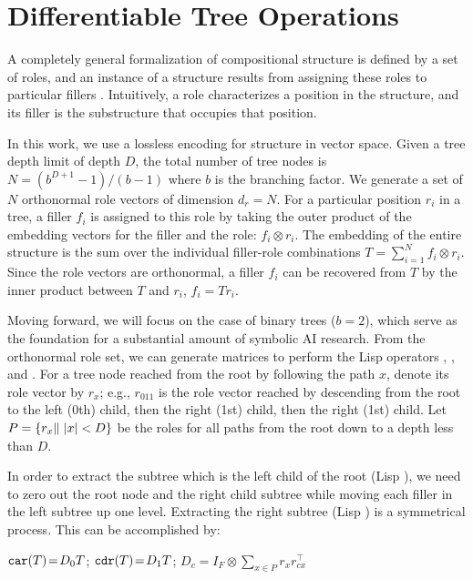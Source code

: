 \section{Differentiable Tree Operations} \label{sec:dtm-tpr}

A completely general formalization of compositional structure is defined by a set of roles, and an instance of a structure results from assigning these roles to particular fillers \citep{Newell1980PhysicalSS}. Intuitively, a role characterizes a position in the structure, and its filler is the substructure that occupies that position. 

In this work, we use a lossless encoding for structure in vector space. Given a tree depth limit of depth $D$, the total number of  tree nodes is $N=(b^{D+1}-1)/(b-1)$ where $b$ is the branching factor. We generate a set of $N$ orthonormal role vectors of dimension $d_r=N$. For a particular position $r_i$ in a tree, a filler $f_i$ is assigned to this role by taking the outer product of the embedding vectors for the filler and the role: $f_i \otimes r_i$. The embedding of the entire structure is the sum over the individual filler-role combinations $T = \sum_{i=1}^N f_i \otimes r_i$. Since the role vectors are orthonormal, a filler $f_i$ can be recovered from $T$ by the inner product between $T$ and $r_i$, $f_i = Tr_i$.

Moving forward, we will focus on the case of binary trees ($b = 2$), which serve as the foundation for a substantial amount of symbolic AI research. From the orthonormal role set, we can generate matrices to perform the Lisp operators \car, \cdr, and \cons. 
For a tree node reached from the root by following the path $x$, denote its role vector by $r_x$; e.g., $r_{011}$ is the role vector reached by descending from the root to the left (0th) child, then the right (1st) child, then the right (1st) child. Let $P = \{r_x \| \hspace{.3em} \lvert x \rvert < D\} $ be the roles for all paths from the root down to a depth less than $D$.

In order to extract the subtree which is the left child of the root (Lisp \car), we need to zero out the root node and the right child subtree while moving each filler in the left subtree up one level. Extracting the right subtree (Lisp \cdr) is a symmetrical process. This can be accomplished by:

$\texttt{car}(T)\!=\!D_0 T$;
$\texttt{cdr}(T)\!=\!D_1 T$;
$D_c \!=\! I_F \! \otimes \! \sum_{x \in P} r_{x}r_{cx}^\top$

